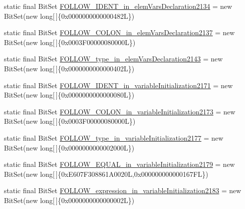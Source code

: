 \begin{DoxyCompactItemize}
\item 
static final Bit\-Set \hyperlink{classorg_1_1tzi_1_1use_1_1parser_1_1ocl_1_1_o_c_l_parser_a7246f5ff8cf5edd7afc856cb125fc3b5}{F\-O\-L\-L\-O\-W\-\_\-\-I\-D\-E\-N\-T\-\_\-in\-\_\-elem\-Vars\-Declaration2134} = new Bit\-Set(new long\mbox{[}$\,$\mbox{]}\{0x0000000000000482\-L\})
\item 
static final Bit\-Set \hyperlink{classorg_1_1tzi_1_1use_1_1parser_1_1ocl_1_1_o_c_l_parser_afb1c30d005d1102f4436e19fe4f8d669}{F\-O\-L\-L\-O\-W\-\_\-\-C\-O\-L\-O\-N\-\_\-in\-\_\-elem\-Vars\-Declaration2137} = new Bit\-Set(new long\mbox{[}$\,$\mbox{]}\{0x0003\-F00000080000\-L\})
\item 
static final Bit\-Set \hyperlink{classorg_1_1tzi_1_1use_1_1parser_1_1ocl_1_1_o_c_l_parser_abcc16fd1f37ed04fe3e7a067a91cecf2}{F\-O\-L\-L\-O\-W\-\_\-type\-\_\-in\-\_\-elem\-Vars\-Declaration2143} = new Bit\-Set(new long\mbox{[}$\,$\mbox{]}\{0x0000000000000402\-L\})
\item 
static final Bit\-Set \hyperlink{classorg_1_1tzi_1_1use_1_1parser_1_1ocl_1_1_o_c_l_parser_a69bfb3c8231c1274ca33d765ec633824}{F\-O\-L\-L\-O\-W\-\_\-\-I\-D\-E\-N\-T\-\_\-in\-\_\-variable\-Initialization2171} = new Bit\-Set(new long\mbox{[}$\,$\mbox{]}\{0x0000000000000080\-L\})
\item 
static final Bit\-Set \hyperlink{classorg_1_1tzi_1_1use_1_1parser_1_1ocl_1_1_o_c_l_parser_a06905115000653abe8c2a7b3b1383ea1}{F\-O\-L\-L\-O\-W\-\_\-\-C\-O\-L\-O\-N\-\_\-in\-\_\-variable\-Initialization2173} = new Bit\-Set(new long\mbox{[}$\,$\mbox{]}\{0x0003\-F00000080000\-L\})
\item 
static final Bit\-Set \hyperlink{classorg_1_1tzi_1_1use_1_1parser_1_1ocl_1_1_o_c_l_parser_a63c378444356bf2a06d15d151414e6e9}{F\-O\-L\-L\-O\-W\-\_\-type\-\_\-in\-\_\-variable\-Initialization2177} = new Bit\-Set(new long\mbox{[}$\,$\mbox{]}\{0x0000000000002000\-L\})
\item 
static final Bit\-Set \hyperlink{classorg_1_1tzi_1_1use_1_1parser_1_1ocl_1_1_o_c_l_parser_a3b3b7481d5bf25f3355dc1cc564fb6fd}{F\-O\-L\-L\-O\-W\-\_\-\-E\-Q\-U\-A\-L\-\_\-in\-\_\-variable\-Initialization2179} = new Bit\-Set(new long\mbox{[}$\,$\mbox{]}\{0x\-E607\-F308861\-A0020\-L,0x000000000000167\-F\-L\})
\item 
static final Bit\-Set \hyperlink{classorg_1_1tzi_1_1use_1_1parser_1_1ocl_1_1_o_c_l_parser_a31ec60d02a63f8a15444808493187794}{F\-O\-L\-L\-O\-W\-\_\-expression\-\_\-in\-\_\-variable\-Initialization2183} = new Bit\-Set(new long\mbox{[}$\,$\mbox{]}\{0x0000000000000002\-L\})
\item 

\end{DoxyCompactItemize}
